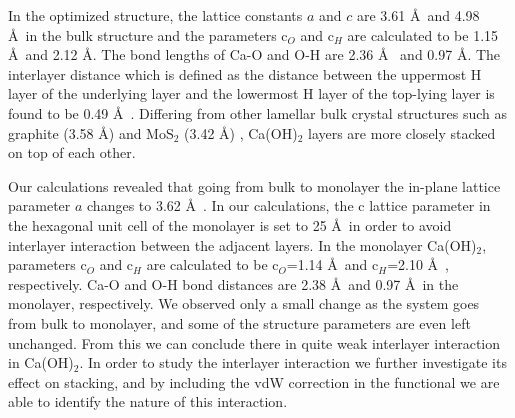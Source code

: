 In the optimized structure, the lattice constants $a$ and $c$ are 3.61 \AA~and 4.98 \AA~in the bulk structure and the parameters c$_O$ and c$_H$ are calculated to be 1.15 \AA~and 2.12 \AA . The bond lengths of Ca-O and O-H are 2.36 \AA~ and 0.97 \AA . The interlayer distance which is defined as the distance between the uppermost H layer of the underlying layer and the lowermost H layer  of the top-lying layer is found to be 0.49 \AA~. Differing from other lamellar bulk crystal structures such as graphite (3.58 \AA) and MoS$_{2}$ (3.42 \AA)\cite{can} , Ca(OH)$_{2}$ layers are more closely stacked on top of each other. 

Our calculations revealed that going from bulk to monolayer the in-plane lattice parameter $a$ changes to 3.62 \AA~. In our calculations, the c lattice parameter in the hexagonal unit cell of the monolayer is set to 25 \AA~in order to avoid interlayer interaction between the adjacent layers. In the monolayer Ca(OH)$_2$, parameters c$_O$ and c$_H$ are calculated to be c$_O$=1.14 \AA~and c$_{H}$=2.10 \AA~, respectively. Ca-O and O-H bond distances are 2.38 \AA~and 0.97 \AA~in the monolayer, respectively. We observed only a small change as the system goes from bulk to monolayer, and some of the structure parameters are even left unchanged. From this we can conclude there in quite weak interlayer interaction in Ca(OH)$_2$. In order to study the interlayer interaction we further investigate its effect on stacking, and by including the vdW correction in the functional we are able to identify the nature of this interaction.

